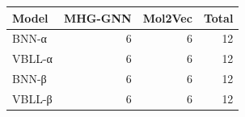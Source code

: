 \begin{tabular}{lrrr}
\toprule
\textbf{Model} & \textbf{MHG-GNN} & \textbf{Mol2Vec} & \textbf{Total} \\
\midrule
BNN-α & 6 & 6 & 12 \\
VBLL-α & 6 & 6 & 12 \\
BNN-β & 6 & 6 & 12 \\
VBLL-β & 6 & 6 & 12 \\
\bottomrule
\end{tabular}